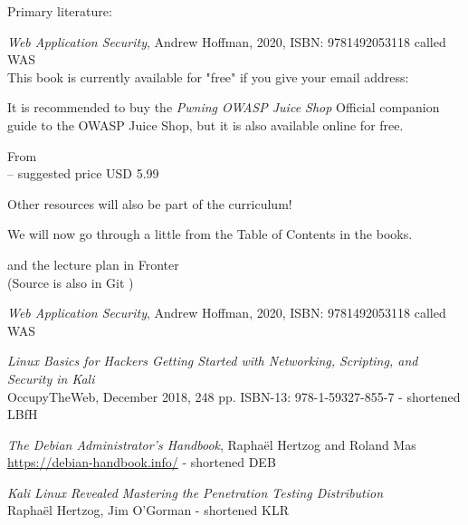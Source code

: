 \documentclass[Screen16to9,17pt]{foils}
\begin{document}

Primary literature:
\begin{list2}
\item \emph{Web Application Security}, Andrew Hoffman, 2020, ISBN: 9781492053118 called WAS\\
This book is currently available for "free" if you give your email address:\\
\end{list2}

It is recommended to buy the \emph{Pwning OWASP Juice Shop} Official companion guide to the OWASP Juice Shop, but it is also available online for free.

From \link{https://leanpub.com/juice-shop](https://leanpub.com/juice-shop}\\
-- suggested price USD 5.99

Other resources will also be part of the curriculum!


We will now go through a little from the Table of Contents in the books.

and the lecture plan in Fronter\\
(Source is also in Git  )



\emph{Web Application Security}, Andrew Hoffman, 2020, ISBN: 9781492053118 called WAS




\begin{list2}
\item \emph{Linux Basics for Hackers Getting Started with Networking, Scripting, and Security in Kali}\\
OccupyTheWeb, December 2018, 248 pp. ISBN-13: 978-1-59327-855-7 - shortened LBfH
\item \emph{The Debian Administrator’s Handbook}, Raphaël Hertzog and Roland Mas\\
\url{https://debian-handbook.info/} - shortened DEB
\item \emph{Kali Linux Revealed  Mastering the Penetration Testing Distribution}\\
Raphaël Hertzog, Jim O'Gorman - shortened KLR
\end{list2}
\end{document}
